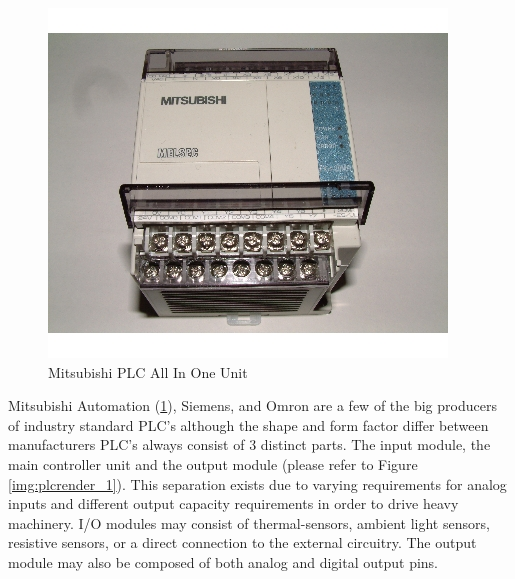 \begin{figure}[htp]
    \centering
    \includegraphics[width=\imgsmlphoto]{./images/c01_mitsubishiplc.jpg}
    \caption{Mitsubishi PLC All In One Unit \cite{img_c01_MitsubishiPlc}}
    \label{img:mitsubishiplc}
\end{figure}
Mitsubishi Automation (\ref{img:mitsubishiplc}), Siemens, and Omron are a few of the big producers of industry standard PLC's although the shape and form factor differ between manufacturers PLC's always consist of 3 distinct parts.  The input module, the main controller unit and the output module (please refer to Figure \ref{img:plcrender_1}). This separation exists due to varying requirements for analog inputs and different output capacity requirements in order to drive heavy machinery. I/O modules may consist of thermal-sensors, ambient light sensors, resistive sensors, or a direct connection to the external circuitry. The output module may also be composed of both analog and digital output pins.
